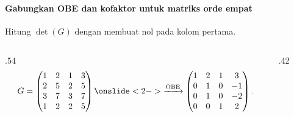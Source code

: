\documentclass{../../kalkulus-ppt}
\begin{document}
\begin{frame}
    \frametitle{\insertsection}
    \framesubtitle{Gabungkan OBE dan kofaktor untuk matriks orde empat}
    \begin{contoh}
        Hitung $\det(G)$ dengan membuat nol pada kolom pertama.
    \end{contoh}
    \begin{columns}[c,onlytextwidth]
        \begin{column}{.54\textwidth}
            \[
                G=\begin{pmatrix}1&2&1&3\\2&5&2&5\\3&7&3&7\\1&2&2&5\end{pmatrix}
                \onslide<2->{%
                    \xrightarrow{\mathrm{OBE}}
                    \begin{pmatrix}1&2&1&3\\0&1&0&-1\\0&1&0&-2\\0&0&1&2\end{pmatrix}.
                }
            \]
        \end{column}
        \begin{column}{.42\textwidth}
        \end{column}
    \end{columns}
\end{frame}
\end{document}
